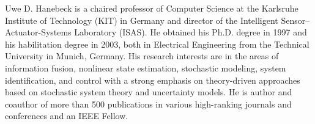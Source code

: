 \documentclass[10pt,letterpaper,oneside,twocolumn,journal]{IEEEtran}
\theoremstyle{definition}
\theoremstyle{definition}
\theoremstyle{remark}
\begin{document}
\begin{IEEEbiography}{Uwe D. Hanebeck}
is a chaired professor of Computer Science at the Karlsruhe Institute of Technology (KIT) in Germany and director of the Intelligent Sensor–Actuator-Systems Laboratory (ISAS). He obtained his Ph.D. degree in 1997 and his habilitation degree in 2003, both in Electrical Engineering from the Technical University in Munich, Germany. His research interests are in the areas of information fusion, nonlinear state estimation, stochastic modeling, system identification, and control with a strong emphasis on theory-driven approaches based on stochastic system theory and uncertainty models. He is author and coauthor of more than 500 publications in various high-ranking journals and conferences and an IEEE Fellow.
\end{IEEEbiography}




\end{document}
